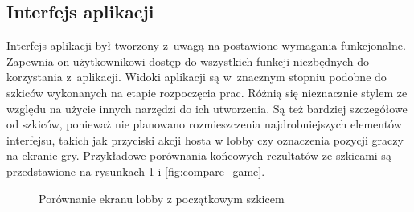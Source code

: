 \subsection{Interfejs aplikacji}

Interfejs aplikacji był tworzony z~uwagą na postawione wymagania funkcjonalne. 
Zapewnia on użytkownikowi dostęp do wszystkich funkcji niezbędnych do korzystania 
z~aplikacji. Widoki aplikacji są w~znacznym stopniu podobne do szkiców wykonanych na etapie 
rozpoczęcia prac. Różnią się nieznacznie stylem ze względu na użycie innych narzędzi 
do ich utworzenia. Są też bardziej szczegółowe od szkiców, ponieważ nie planowano 
rozmieszczenia najdrobniejszych elementów interfejsu, takich jak przyciski akcji hosta 
w lobby czy oznaczenia pozycji graczy na ekranie gry. Przykładowe porównania końcowych 
rezultatów ze szkicami są przedstawione na rysunkach \ref{fig:compare_lobby} i 
\ref{fig:compare_game}.

\begin{figure}[h!]
    \centering
    \hspace*{0.5cm}
    \caption{Porównanie ekranu lobby z początkowym szkicem}
    \label{fig:compare_lobby}
  \end{figure}
  
  \FloatBarrier

